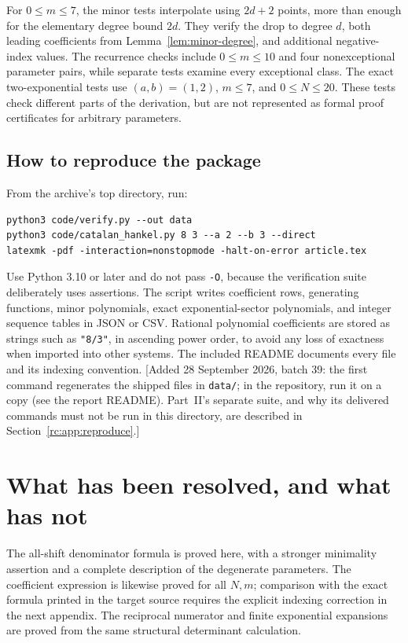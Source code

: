\documentclass[11pt,a4paper]{article}
\numberwithin{equation}{section}
\theoremstyle{definition}
\theoremstyle{remark}
\begin{document}
For $0\leq m\leq7$, the minor tests interpolate using $2d+2$ points,
more than enough for the elementary degree bound $2d$.  They verify
the drop to degree $d$, both leading coefficients from
Lemma~\ref{lem:minor-degree}, and additional negative-index values.
The recurrence checks include $0\leq m\leq10$ and four nonexceptional
parameter pairs, while separate tests examine every exceptional class.
The exact two-exponential tests use $(a,b)=(1,2)$, $m\leq7$, and
$0\leq N\leq20$.  These tests check different parts of the derivation,
but are not represented as formal proof certificates for arbitrary
parameters.

\subsection{How to reproduce the package}
From the archive's top directory, run:
\begin{lstlisting}
python3 code/verify.py --out data
python3 code/catalan_hankel.py 8 3 --a 2 --b 3 --direct
latexmk -pdf -interaction=nonstopmode -halt-on-error article.tex
\end{lstlisting}
Use Python 3.10 or later and do not pass \texttt{-O}, because the
verification suite deliberately uses assertions.  The script writes
coefficient rows, generating functions, minor polynomials, exact
exponential-sector polynomials, and integer sequence tables in JSON or
CSV.  Rational polynomial coefficients are stored as strings such as
\texttt{"8/3"}, in ascending power order, to avoid any loss of exactness
when imported into other systems.  The included README documents every
file and its indexing convention.
[Added 28 September 2026, batch 39: the first command regenerates the
shipped files in \texttt{data/}; in the repository, run it on a copy (see
the report README).  Part~II's separate suite, and why its delivered
commands must not be run in this directory, are described in
Section~\ref{rc:app:reproduce}.]

\section{What has been resolved, and what has not}\label{sec:status}

The all-shift denominator formula is proved here, with a stronger
minimality assertion and a complete description of the degenerate
parameters.  The coefficient expression is likewise proved for all
$N,m$; comparison with the exact formula printed in the target source
requires the explicit indexing correction in the next appendix.
The reciprocal numerator and finite exponential expansions are proved
from the same structural determinant calculation.
\end{document}
